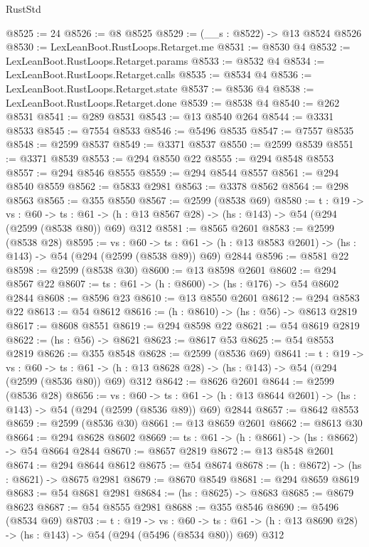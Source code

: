 \begin{lexlean}{RustStd}
\begin{coremodule}
@8525 := 24
@8526 := @8 @8525
@8529 := (__s : @8522) -> @13 @8524 @8526
@8530 := LexLeanBoot.RustLoops.Retarget.me
@8531 := @8530 @4
@8532 := LexLeanBoot.RustLoops.Retarget.params
@8533 := @8532 @4
@8534 := LexLeanBoot.RustLoops.Retarget.calls
@8535 := @8534 @4
@8536 := LexLeanBoot.RustLoops.Retarget.state
@8537 := @8536 @4
@8538 := LexLeanBoot.RustLoops.Retarget.done
@8539 := @8538 @4
@8540 := @262 @8531
@8541 := @289 @8531
@8543 := @13 @8540 @264
@8544 := @3331 @8533
@8545 := @7554 @8533
@8546 := @5496 @8535
@8547 := @7557 @8535
@8548 := @2599 @8537
@8549 := @3371 @8537
@8550 := @2599 @8539
@8551 := @3371 @8539
@8553 := @294 @8550 @22
@8555 := @294 @8548 @8553
@8557 := @294 @8546 @8555
@8559 := @294 @8544 @8557
@8561 := @294 @8540 @8559
@8562 := @5833 @2981
@8563 := @3378 @8562
@8564 := @298 @8563
@8565 := @355 @8550
@8567 := @2599 (@8538 @69)
@8580 := {t : @19} ->
  {vs : @60} ->
  {ts : @61} -> (h : @13 @8567 @28) -> (hs : @143) -> @54 (@294 (@2599 (@8538 @80)) @69) @312
@8581 := @8565 @2601
@8583 := @2599 (@8538 @28)
@8595 := {vs : @60} ->
  {ts : @61} -> (h : @13 @8583 @2601) -> (hs : @143) -> @54 (@294 (@2599 (@8538 @89)) @69) @2844
@8596 := @8581 @22
@8598 := @2599 (@8538 @30)
@8600 := @13 @8598 @2601
@8602 := @294 @8567 @22
@8607 := {ts : @61} -> (h : @8600) -> (hs : @176) -> @54 @8602 @2844
@8608 := @8596 @23
@8610 := @13 @8550 @2601
@8612 := @294 @8583 @22
@8613 := @54 @8612
@8616 := (h : @8610) -> (hs : @56) -> @8613 @2819
@8617 := @8608 @8551
@8619 := @294 @8598 @22
@8621 := @54 @8619 @2819
@8622 := (hs : @56) -> @8621
@8623 := @8617 @53
@8625 := @54 @8553 @2819
@8626 := @355 @8548
@8628 := @2599 (@8536 @69)
@8641 := {t : @19} ->
  {vs : @60} ->
  {ts : @61} -> (h : @13 @8628 @28) -> (hs : @143) -> @54 (@294 (@2599 (@8536 @80)) @69) @312
@8642 := @8626 @2601
@8644 := @2599 (@8536 @28)
@8656 := {vs : @60} ->
  {ts : @61} -> (h : @13 @8644 @2601) -> (hs : @143) -> @54 (@294 (@2599 (@8536 @89)) @69) @2844
@8657 := @8642 @8553
@8659 := @2599 (@8536 @30)
@8661 := @13 @8659 @2601
@8662 := @8613 @30
@8664 := @294 @8628 @8602
@8669 := {ts : @61} -> (h : @8661) -> (hs : @8662) -> @54 @8664 @2844
@8670 := @8657 @2819
@8672 := @13 @8548 @2601
@8674 := @294 @8644 @8612
@8675 := @54 @8674
@8678 := (h : @8672) -> (hs : @8621) -> @8675 @2981
@8679 := @8670 @8549
@8681 := @294 @8659 @8619
@8683 := @54 @8681 @2981
@8684 := (hs : @8625) -> @8683
@8685 := @8679 @8623
@8687 := @54 @8555 @2981
@8688 := @355 @8546
@8690 := @5496 (@8534 @69)
@8703 := {t : @19} ->
  {vs : @60} ->
  {ts : @61} -> (h : @13 @8690 @28) -> (hs : @143) -> @54 (@294 (@5496 (@8534 @80)) @69) @312

\end{coremodule}
\end{lexlean}

